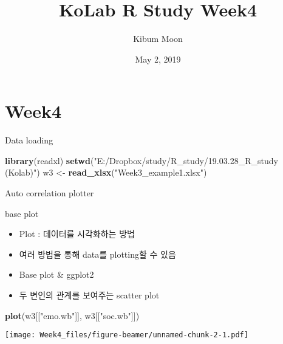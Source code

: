 \documentclass[ignorenonframetext,]{beamer}
\title{KoLab R Study Week4}
\author{Kibum Moon}
\date{May 2, 2019}
\newenvironment{Shaded}{\begin{snugshade}}{\end{snugshade}}
\newcommand{\KeywordTok}[1]{\textcolor[rgb]{0.13,0.29,0.53}{\textbf{#1}}}
\newcommand{\StringTok}[1]{\textcolor[rgb]{0.31,0.60,0.02}{#1}}
\newcommand{\NormalTok}[1]{#1}
\begin{document}
\frame{\titlepage}

\section{Week4}\label{week4}

\begin{frame}[fragile]{Data loading}

\begin{Shaded}
\begin{Highlighting}[]
\KeywordTok{library}\NormalTok{(readxl)}
\KeywordTok{setwd}\NormalTok{(}\StringTok{"E:/Dropbox/study/R_study/19.03.28_R_study (Kolab)"}\NormalTok{)}
\NormalTok{w3 <-}\StringTok{ }\KeywordTok{read_xlsx}\NormalTok{(}\StringTok{"Week3_example1.xlsx"}\NormalTok{)}
\end{Highlighting}
\end{Shaded}

\end{frame}

\begin{frame}[fragile]{Auto correlation plotter}

\begin{block}{base plot}

\begin{itemize}
\item
  Plot : 데이터를 시각화하는 방법
\item
  여러 방법을 통해 data를 plotting할 수 있음
\item
  Base plot \& ggplot2
\item
  두 변인의 관계를 보여주는 scatter plot
\end{itemize}

\begin{Shaded}
\begin{Highlighting}[]
\KeywordTok{plot}\NormalTok{(w3[[}\StringTok{"emo.wb"}\NormalTok{]], w3[[}\StringTok{"soc.wb"}\NormalTok{]]) }
\end{Highlighting}
\end{Shaded}

\texttt{[image: Week4\_files/figure-beamer/unnamed-chunk-2-1.pdf]}

\end{block}

\end{frame}
\end{document}
